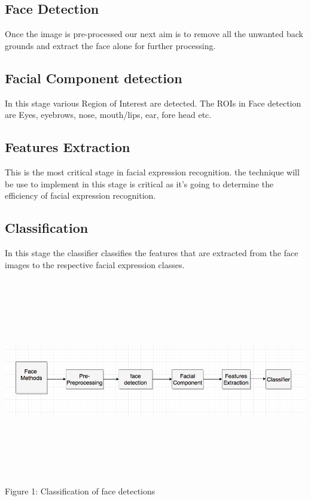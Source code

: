 \documentclass[12pt]{report}
\begin{document}
\subsection{Face Detection}

Once the image is pre-processed our next aim is to remove all the unwanted back grounds and extract the face alone for further processing.
\subsection{Facial Component detection}

In this stage various Region of Interest are detected. The ROIs in Face detection are Eyes, eyebrows, nose, mouth/lips, ear, fore head etc.
\subsection{Features Extraction}

This is the most critical stage in facial expression recognition. the technique will be use to implement in this stage is critical as it's going to determine the efficiency of facial expression recognition.

\subsection{Classification}
In this stage the classifier classifies the features that are
extracted from the face images to the respective facial expression
classes.

\includegraphics[width = 15cm, height = 9cm ]{figure1.png}
Figure 1: Classification of face detections

 
\end{document}
